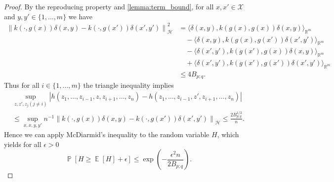 \documentclass{article}
\DeclareMathOperator{\Prob}{\mathbb{P}}
\DeclareMathOperator{\Expect}{\mathbb{E}}
\begin{document}
\begin{proof}
  By the reproducing property and \cref{lemma:term_bound}, for all
  $x,x' \in \mathcal{X}$ and $y,y' \in \{1,\ldots,m\}$ we have
  \begin{equation*}
    \begin{split}
      \left\|k(\cdot, g(x)) \delta(x,y) - k(\cdot, g(x')) \delta(x', y')\right\|^2_{\mathcal{H}} &= \langle \delta(x,y), k(g(x),g(x)) \delta(x,y)\rangle_{\mathbb{R}^m} \\
      &\quad - \langle \delta(x,y), k(g(x), g(x')) \delta(x', y') \rangle_{\mathbb{R}^m} \\
      &\quad - \langle \delta(x', y'), k(g(x'), g(x)) \delta(x,y)\rangle_{\mathbb{R}^m} \\
      &\quad + \langle \delta(x', y'), k(g(x'), g(x')) \delta(x',y')\rangle_{\mathbb{R}^m} \\
      &\leq 4 B_{p;q}.
    \end{split}
  \end{equation*}
  Thus for all $i \in \{1,\ldots,m\}$ the triangle inequality implies
  \begin{multline*}
    \sup_{z, z', z_j (j \neq i)} |h(z_1,\ldots,z_{i-1},z,z_{i+1},\ldots,z_n) - h(z_1,\ldots,z_{i-1},z',z_{i+1},\ldots,z_n)| \\
    \leq \sup_{x,x,y,y'} n^{-1} \left\|k(\cdot, g(x)) \delta(x,y) - k(\cdot, g(x')) \delta(x', y')\right\|_{\mathcal{H}} \leq \frac{2 B_{p;q}^{1/2}}{n}.
  \end{multline*}
  Hence we can apply McDiarmid's inequality to the random variable $H$, which
  yields for all $\epsilon > 0$
  \begin{equation}\label{eq:mcdiarmid_skce}
    \Prob\left[H \geq \Expect[H] + \epsilon \right] \leq \exp{\left(-\frac{\epsilon^2 n}{2 B_{p;q}}\right)}.
  \end{equation}


\end{proof}
\end{document}
